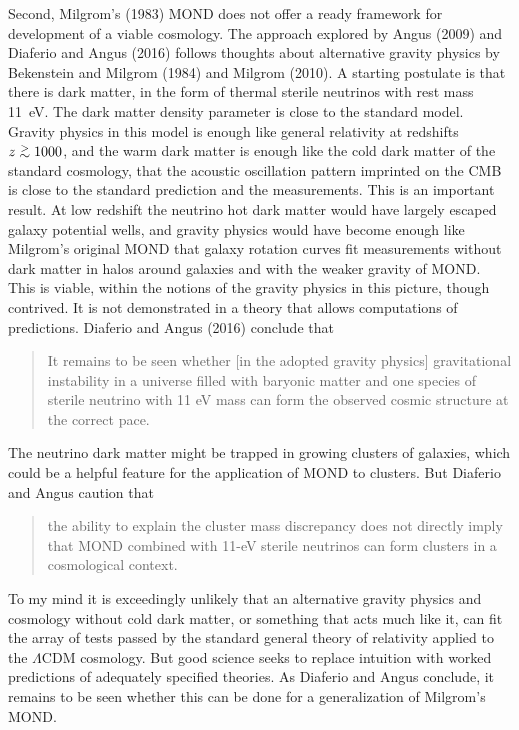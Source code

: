 \documentclass[fleqn,usenatbib]{mnras}
\def\gap{\lower.5ex\hbox{$\; \buildrel > \over \sim \;$}}
\begin{document}
Second, Milgrom's (1983) MOND does not offer a ready framework for development of a viable cosmology. The approach explored by Angus (2009) and Diaferio and Angus (2016) follows thoughts about alternative gravity physics by Bekenstein and Milgrom (1984) and Milgrom (2010). A starting  postulate is that there is dark matter, in the form of thermal sterile neutrinos with rest mass 11~eV. The dark matter density parameter is close to the standard model. Gravity physics in this model is enough like general relativity at redshifts $z \gap 1000$, and the warm dark matter is enough like the cold dark matter of the standard cosmology, that the acoustic oscillation pattern imprinted on the CMB is close to the standard prediction and the measurements. This is an important result. At low redshift the neutrino hot dark matter would have largely escaped galaxy potential wells, and gravity physics would have become enough like Milgrom's original MOND that galaxy rotation curves fit measurements without dark matter in halos around galaxies and with the weaker gravity of MOND. This is viable, within the notions of the gravity physics in this picture, though contrived. It is not demonstrated in a theory that allows computations of predictions. Diaferio and Angus (2016) conclude that
\begin{quotation}
It remains to be seen whether [in the adopted gravity physics] gravitational instability in a universe filled with baryonic matter and one species of sterile neutrino with 11 eV mass can form the observed cosmic structure at the correct pace.
\end{quotation}
The neutrino dark matter might be trapped in growing clusters of galaxies, which could be a helpful feature for the application of MOND to clusters. But Diaferio and Angus caution that 
\begin{quotation}
 the ability to explain the cluster mass discrepancy does not directly imply that MOND combined with 11-eV sterile neutrinos can form clusters in a cosmological context.
\end{quotation}
 
To my mind it is exceedingly unlikely that an alternative gravity physics and cosmology without cold dark matter, or something that acts much like it, can fit the array of tests passed by the standard general theory of relativity applied to the $\Lambda$CDM cosmology. But good science seeks to replace intuition with worked predictions of adequately specified theories. As Diaferio and Angus conclude, it remains to be seen whether this can be done for a generalization of Milgrom's MOND. 
\end{document}
